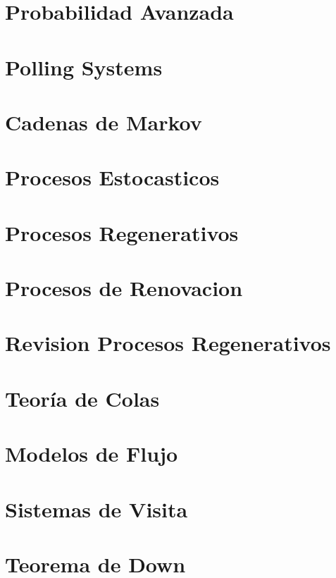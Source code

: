 \documentclass{report}
\begin{document}
\chapter{Probabilidad Avanzada}
%

\chapter{Polling Systems}


\chapter{Cadenas de Markov}


\chapter{Procesos Estocasticos}


\chapter{Procesos Regenerativos}


\chapter{Procesos de Renovacion}


\chapter{Revision Procesos Regenerativos}


\chapter{Teoría de Colas}


\chapter{Modelos de Flujo}


\chapter{Sistemas de Visita}


\chapter{Teorema de Down}

\end{document}
